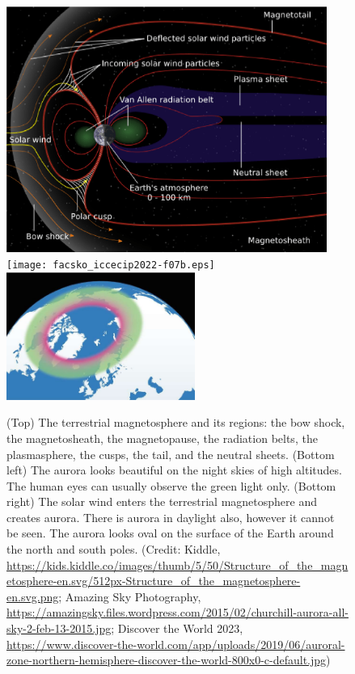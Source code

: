 \documentclass[sn-aps]{sn-jnl}%
\begin{document}
\begin{figure}[t]
\centering
\includegraphics[width=0.935\textwidth]{facsko_iccecip2022-f07a.eps}
\texttt{[image: facsko\_iccecip2022-f07b.eps]}
\includegraphics[width=0.55\textwidth]{facsko_iccecip2022-f07c.eps}
\caption{(Top) The terrestrial magnetosphere and its regions: the bow shock, the magnetosheath, the magnetopause, the radiation belts, the plasmasphere, the cusps, the tail, and the neutral sheets. (Bottom left) The aurora looks beautiful on the night skies of high altitudes. The human eyes can usually observe the green light only. (Bottom right) The solar wind enters the terrestrial magnetosphere and creates aurora. There is aurora in daylight also, however it cannot be seen. The aurora looks oval on the surface of the Earth around the north and south poles. (Credit: Kiddle, \url{https://kids.kiddle.co/images/thumb/5/50/Structure_of_the_magnetosphere-en.svg/512px-Structure_of_the_magnetosphere-en.svg.png}; Amazing Sky Photography, \url{https://amazingsky.files.wordpress.com/2015/02/churchill-aurora-all-sky-2-feb-13-2015.jpg}; Discover the World 2023, \url{https://www.discover-the-world.com/app/uploads/2019/06/auroral-zone-northern-hemisphere-discover-the-world-800x0-c-default.jpg})} \label{fig:aurora}
\end{figure}
\end{document}
